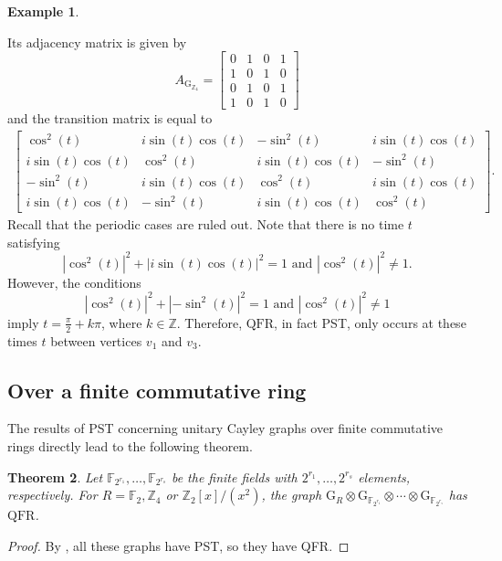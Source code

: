 \documentclass[12pt]{amsart}
\numberwithin{equation}{section}
\newtheorem{thm}{Theorem}[section]
\theoremstyle{definition}
\newtheorem{ex}[thm]{Example}
\theoremstyle{definition} \numberwithin{equation}{section}
\newcommand{\G}{\mathrm{G}}
\newcommand{\QFR}{\mathrm{QFR}}
\begin{document}
\begin{ex}
\begin{enumerate}
\begin{center}
\end{center}
Its adjacency matrix is given by
\[
A_{\G_{\mathbb{Z}_4}} = \begin{bmatrix}
            0 & 1 & 0 & 1 \\
               1 & 0 & 1 & 0 \\
               0 & 1 & 0 & 1 \\
               1 & 0 & 1 & 0  
    \end{bmatrix}
\]
and the transition matrix is equal to 
\begin{align*}
          \begin{bmatrix}
\cos^2(t) & i\sin(t)\cos(t) & -\sin^2(t) & i\sin(t)\cos(t) \\
i\sin(t)\cos(t) & \cos^2(t) & i\sin(t)\cos(t) & -\sin^2(t) \\
-\sin^2(t) & i\sin(t)\cos(t) & \cos^2(t) & i\sin(t)\cos(t) \\
i\sin(t)\cos(t) & -\sin^2(t) & i\sin(t)\cos(t) & \cos^2(t)
\end{bmatrix}.
    \end{align*}
Recall that the periodic cases are ruled out. Note that there is no time $t$ satisfying 
\[
|\cos^2(t)|^2 + |i \sin(t) \cos (t)|^2 = 1 \text{ and } |\cos^2(t)|^2 \neq 1.
\]
However, the conditions 
\[
|\cos^2(t)|^2 + |- \sin^2(t)|^2 = 1 \text{ and } |\cos^2(t)|^2 \neq 1 
\]
imply $t = \frac{\pi}{2} + k \pi$, where $k \in \mathbb{Z}$. Therefore, $\QFR$, in fact PST, only occurs at these times $t$ between vertices $v_1$ and $v_3$.
\end{enumerate}

\end{ex}

\subsection{Over a finite commutative ring}

The results of PST concerning unitary Cayley graphs over finite commutative rings directly lead to the following theorem.

\begin{thm}
    Let $\mathbb{F}_{2^{r_1}}, \ldots, \mathbb{F}_{2^{r_s}}$ be the finite fields with $2^{r_1},\ldots,2^{r_s}$ elements, respectively. For $R = \mathbb{F}_2, \mathbb{Z}_4$ or $\mathbb{Z}_2[x] / (x^2)$, the graph $\G_R \otimes \G_{\mathbb{F}_{2^{r_1}}} \otimes 
    \cdots 
    \otimes \G_{\mathbb{F}_{2^{r_s}}}$ has $\QFR$. 
\end{thm}
\begin{proof}
   By \cite[Theorem 2.5]{TI}, all these graphs have PST, so they have QFR.
\end{proof}
\end{document}
